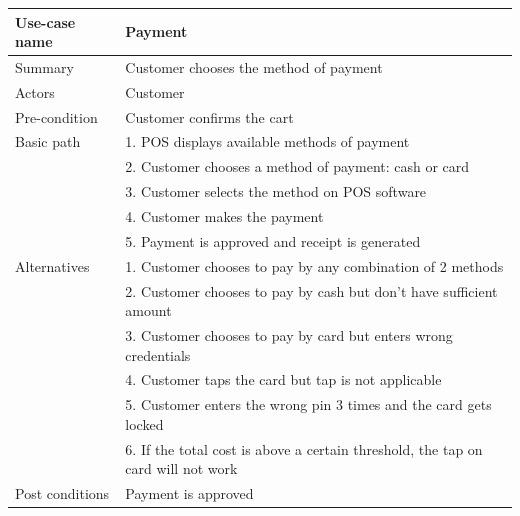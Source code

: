 \begin{center}
  \begin{tabular}{*{2}{l}}
    \toprule
    Use-case name   & Payment                                                                          \\
    \midrule
    Summary         & Customer chooses the method of payment                                           \\
    \midrule
    Actors          & Customer                                                                         \\
    \midrule
    Pre-condition   & Customer confirms the cart                                                       \\
    \midrule
    Basic path      & 1. POS displays available methods of payment                                     \\
                    & 2. Customer chooses a method of payment: cash or card                            \\
                    & 3. Customer selects the method on POS software                                   \\
                    & 4. Customer makes the payment                                                    \\
                    & 5. Payment is approved and receipt is generated                                  \\
    \midrule
    Alternatives    & 1. Customer chooses to pay by any combination of 2 methods                       \\
                    & 2. Customer chooses to pay by cash but don't have sufficient amount              \\
                    & 3. Customer chooses to pay by card but enters wrong credentials                  \\
                    & 4. Customer taps the card but tap is not applicable                              \\
                    & 5. Customer enters the wrong pin 3 times and the card gets locked                \\
                    & 6. If the total cost is above a certain threshold, the tap on card will not work \\
    \midrule
    Post conditions & Payment is approved                                                              \\
    \bottomrule
  \end{tabular}
\end{center}
